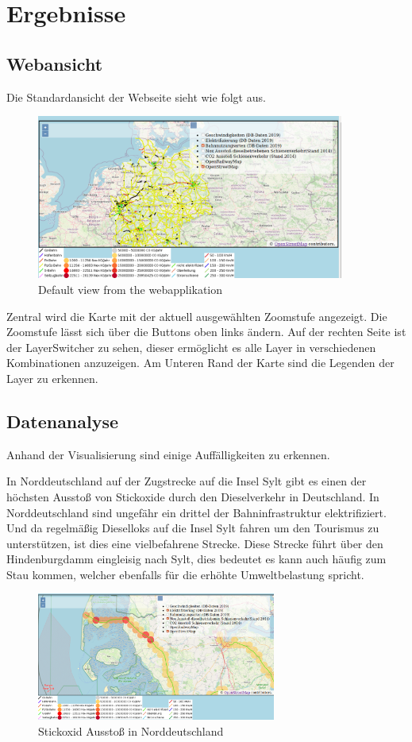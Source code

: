\section{Ergebnisse}

\subsection{Webansicht}

Die Standardansicht der Webseite sieht wie folgt aus. 
\begin{figure}[h]
\centering
	\includegraphics[width=0.9\textwidth]{images/defaultview.png}
	\caption{Default view from the webapplikation}
\end{figure}
Zentral wird die Karte mit der aktuell ausgewählten Zoomstufe angezeigt. Die Zoomstufe lässt sich über die Buttons oben links ändern. Auf der rechten Seite ist der LayerSwitcher zu sehen, dieser ermöglicht es alle Layer in verschiedenen Kombinationen anzuzeigen. Am Unteren Rand der Karte sind die Legenden der Layer zu erkennen.
\pagebreak
\subsection{Datenanalyse}
Anhand der Visualisierung sind einige Auffälligkeiten zu erkennen.

In Norddeutschland auf der Zugstrecke auf die Insel Sylt gibt es einen der höchsten Ausstoß von Stickoxide durch den Dieselverkehr in Deutschland. In Norddeutschland sind ungefähr ein drittel der Bahninfrastruktur elektrifiziert.\cite{marschbahn} Und da regelmäßig Dieselloks auf die Insel Sylt fahren um den Tourismus zu unterstützen, ist dies eine vielbefahrene Strecke. Diese Strecke führt über den Hindenburgdamm eingleisig nach Sylt, dies bedeutet es kann auch häufig zum Stau kommen, welcher ebenfalls für die erhöhte Umweltbelastung spricht. \cite{marschbahn}
\begin{figure}[h]
\centering
	\includegraphics[width=0.7\textwidth]{images/Analyse1.png}
	\caption{Stickoxid Ausstoß in Norddeutschland}
\end{figure}

